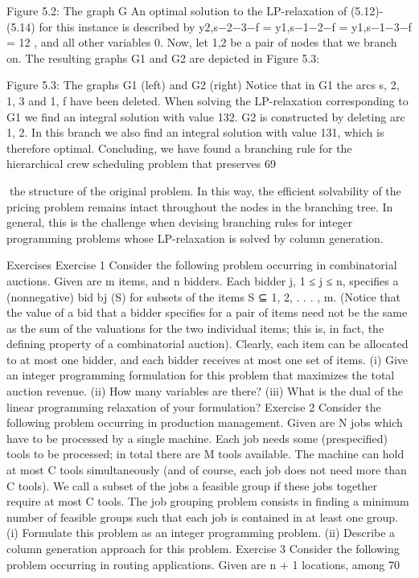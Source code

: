 Figure 5.2: The graph G
An optimal solution to the LP-relaxation of (5.12)-(5.14) for this instance is described by y2,s−2−3−f =
y1,s−1−2−f = y1,s−1−3−f = 12 , and all other variables 0. Now, let 1,2 be a pair of nodes that we branch
on. The resulting graphs G1 and G2 are depicted in Figure 5.3:



Figure 5.3: The graphs G1 (left) and G2 (right)
Notice that in G1 the arcs {s, 2}, {1, 3} and {1, f } have been deleted. When solving the LP-relaxation
corresponding to G1 we find an integral solution with value 132. G2 is constructed by deleting arc {1, 2}.
In this branch we also find an integral solution with value 131, which is therefore optimal.
Concluding, we have found a branching rule for the hierarchical crew scheduling problem that preserves
69

the structure of the original problem. In this way, the efficient solvability of the pricing problem remains
intact throughout the nodes in the branching tree. In general, this is the challenge when devising
branching rules for integer programming problems whose LP-relaxation is solved by column generation.

Exercises
Exercise 1
Consider the following problem occurring in combinatorial auctions. Given are m items, and n bidders.
Each bidder j, 1 ≤ j ≤ n, specifies a (nonnegative) bid bj (S) for subsets of the items S ⊆ {1, 2, . . . , m}.
(Notice that the value of a bid that a bidder specifies for a pair of items need not be the same as the sum
of the valuations for the two individual items; this is, in fact, the defining property of a combinatorial
auction). Clearly, each item can be allocated to at most one bidder, and each bidder receives at most
one set of items.
(i) Give an integer programming formulation for this problem that maximizes the total auction revenue.
(ii) How many variables are there?
(iii) What is the dual of the linear programming relaxation of your formulation?
Exercise 2
Consider the following problem occurring in production management. Given are N jobs which have to be
processed by a single machine. Each job needs some (prespecified) tools to be processed; in total there
are M tools available. The machine can hold at most C tools simultaneously (and of course, each job
does not need more than C tools). We call a subset of the jobs a feasible group if these jobs together
require at most C tools. The job grouping problem consists in finding a minimum number of feasible
groups such that each job is contained in at least one group.
(i) Formulate this problem as an integer programming problem.
(ii) Describe a column generation approach for this problem.
Exercise 3
Consider the following problem occurring in routing applications. Given are n + 1 locations, among
70

